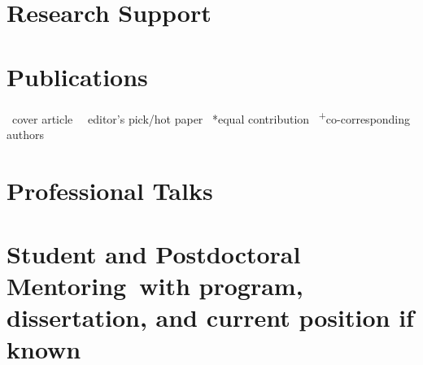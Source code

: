 \documentclass[11pt]{article}
\begin{document}

\section*[Research Support]{Research Support}


\section*[Publications]{Publications \small {} \textbar \ }
\faImage \ cover article \textbar \ \faStar \ editor’s pick/hot paper \textbar\ *equal contribution \textbar\ \textsuperscript{+}co-corresponding authors


\section*[Professional Talks]{Professional Talks}


\section*[Student and Postdoctoral Mentoring]{Student and Postdoctoral Mentoring\ \small with program, dissertation, and current position if known}


\end{document}
